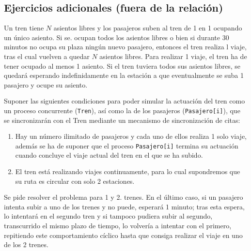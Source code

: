 \subsection{Ejercicios adicionales (fuera de la relación)}
\begin{ejercicio}
    Un tren tiene $N$ asientos libres y los pasajeros suben al tren de 1 en 1 ocupando un único asiento. Si se. ocupan todos los asientos libres o bien si durante 30 minutos no ocupa su plaza ningún nuevo pasajero, entonces el tren realiza l viaje, tras el cual vuelven a quedar $N$ asientos libres. Para realizar 1 viaje, el tren ha de tener ocupado al menos 1 asiento. Si el tren tuviera todos sus asientos libres, se quedará esperando indefinidamente en la estación a que eventualmente se suba 1 pasajero y ocupe su asiento.

    Suponer las siguientes condiciones para poder simular la actuación del tren como un proceso concurrente (\verb|Tren|), así como la de los pasajeros (\verb|Pasajero[i]|), que se sincronizarán con el Tren mediante un mecanismo de sincronización de citas:
    \begin{enumerate}
        \item Hay un número ilimitado de pasajeros y cada uno de ellos realiza 1 solo viaje, además se ha de suponer que el proceso \verb|Pasajero[i]| termina su actuación cuando concluye el viaje actual del tren en el que se ha subido.
        \item El tren está realizando viajes continuamente, para lo cual supondremos que su ruta es circular con solo 2 estaciones.
    \end{enumerate}
    Se pide resolver el problema para 1 y 2. trenes. En el último caso, si un pasajero intenta subir a uno de los trenes y no puede, esperará 1 minuto; tras esta espera, lo intentará en el segundo tren y si tampoco pudiera subir al segundo, transcurrido el mismo plazo de tiempo, lo volvería a intentar con el primero, repitiendo este comportamiento cíclico hasta que con­siga realizar el viaje en uno de los 2 trenes.
\end{ejercicio}

